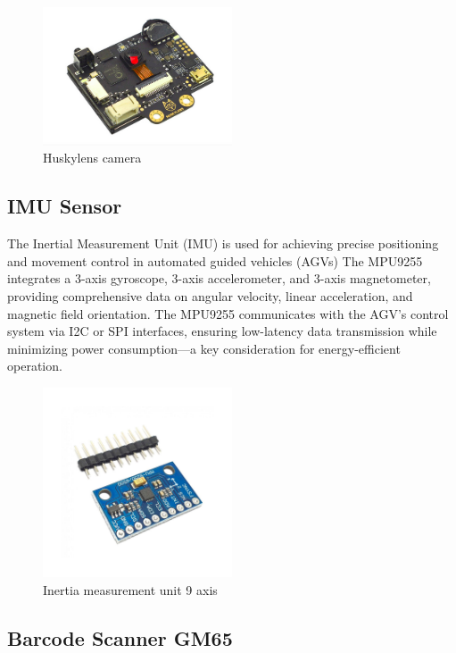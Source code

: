 \documentclass[../../main]{subfiles}
\begin{document}
\begin{figure}[H]
    \centering
    \includegraphics[width=0.5\textwidth]{fig/huskylens.png}
    \caption{ Huskylens camera}
    \label{ Huskylens camera} %
\end{figure}


\subsection{IMU Sensor}

The Inertial Measurement Unit (IMU)  is used for achieving precise positioning and movement control in automated guided vehicles (AGVs)
The MPU9255 integrates a 3-axis gyroscope, 3-axis accelerometer, and 3-axis magnetometer, providing comprehensive data on angular velocity, 
linear acceleration, and magnetic field orientation. The MPU9255 communicates with the AGV’s control system via I2C or SPI interfaces, 
ensuring low-latency data transmission while minimizing power consumption—a key consideration for energy-efficient operation.

\begin{figure}[H]
    \centering
    \includegraphics[width=0.5\textwidth]{fig/imu.jpg}
    \caption{ Inertia measurement unit 9 axis}
    \label{IMU} %
\end{figure}

\subsection{Barcode Scanner GM65}
\end{document}

